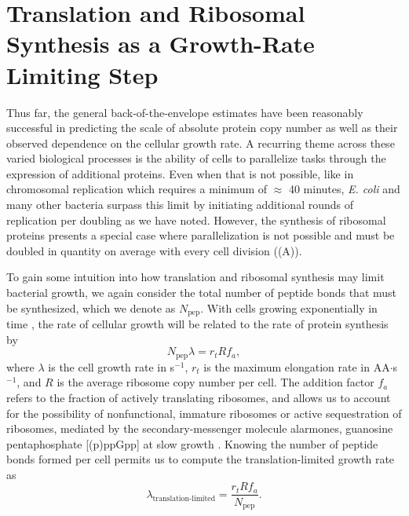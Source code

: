 
\section{Translation and Ribosomal Synthesis as a Growth-Rate Limiting Step}
Thus far, the general back-of-the-envelope estimates have been reasonably
successful in predicting the scale of absolute protein copy number as well as
their observed dependence on the cellular growth rate. A recurring theme across
these varied biological processes is the ability of cells to  parallelize tasks
through the expression of additional proteins.  Even when that is not possible,
like in chromosomal replication which  requires a minimum of $\approx$ 40
minutes, \textit{E. coli} and many other bacteria surpass this limit by
initiating additional rounds of replication per doubling as we have noted. However, the synthesis
of ribosomal proteins presents a special case where parallelization is not
possible and must be doubled in quantity on average with every cell division
((A)).

To gain some intuition into how translation and ribosomal synthesis may limit
bacterial growth, we again consider the total number of peptide bonds that must
be synthesized, which we denote as $N_\text{pep}$. With cells growing exponentially in time
\citep{godin2010}, the rate of cellular growth will be related to the rate of protein synthesis by
\begin{equation}
    N_\text{pep} \lambda = r_t R f_a,
    \label{eq:mass_balance}
\end{equation}
where $\lambda$ is the cell growth rate in s$^{-1}$, $r_t$ is the maximum
elongation rate in AA$\cdot$s$^{-1}$, and $R$ is the average ribosome copy
number per cell. The addition factor $f_a$ refers to the fraction of actively
translating ribosomes, and allows us to account for the possibility of
nonfunctional, immature ribosomes or active sequestration of ribosomes, mediated
by the secondary-messenger molecule alarmones, guanosine pentaphosphate
[(p)ppGpp] at slow growth \citep{dennis2004, dai2016}. Knowing the number of
peptide bonds formed per cell permits us to compute the translation-limited growth
rate as
\begin{equation}
\lambda_\text{translation-limited} = \frac{r_t R f_a}{N_\text{pep}}.
\label{eq:lambda_limit}
\end{equation}

